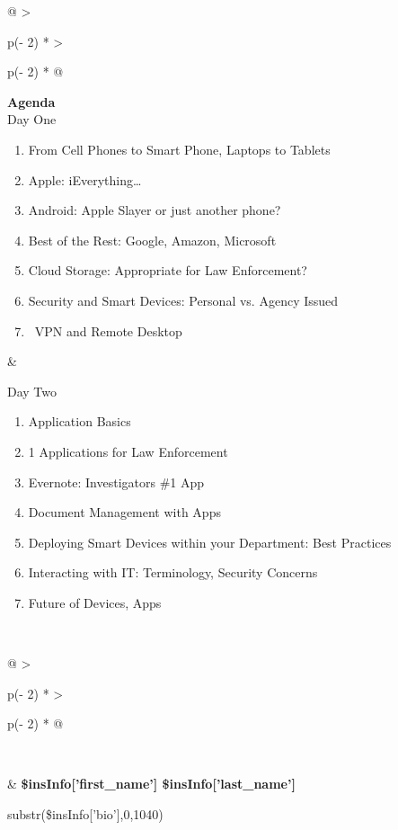 \documentclass[legalpaper,10pt]{article}
\providecommand{\tightlist}{
  \setlength{\itemsep}{0pt}\setlength{\parskip}{0pt}}
\begin{document}
\begin{longtable}[]{@{}
  >{\raggedright\arraybackslash}p{(\columnwidth - 2\tabcolsep) * }
  >{\raggedright\arraybackslash}p{(\columnwidth - 2\tabcolsep) * }@{}}
\toprule
\endhead
\begin{minipage}[t]{\linewidth}\raggedright
\textbf{Agenda}\\
Day One

\begin{enumerate}
\tightlist
\item
  From Cell Phones to Smart Phone, Laptops to Tablets
\item
  Apple: iEverything\ldots{}
\item
  Android: Apple Slayer or just another phone?
\item
  Best of the Rest: Google, Amazon, Microsoft
\item
  Cloud Storage: Appropriate for Law Enforcement?
\item
  Security and Smart Devices: Personal vs. Agency Issued
\item
  ~VPN and Remote Desktop
\end{enumerate}
\end{minipage} & \begin{minipage}[t]{\linewidth}\raggedright
\hfill\break
Day Two

\begin{enumerate}
\tightlist
\item
  Application Basics
\item
  1 Applications for Law Enforcement
\item
  Evernote: Investigators \#1 App
\item
  Document Management with Apps
\item
  Deploying Smart Devices within your Department: Best Practices
\item
  Interacting with IT: Terminology, Security Concerns
\item
  Future of Devices, Apps~
\end{enumerate}
\end{minipage} \\
\bottomrule
\end{longtable}

\begin{longtable}[]{@{}
  >{\raggedright\arraybackslash}p{(\columnwidth - 2\tabcolsep) * }
  >{\raggedright\arraybackslash}p{(\columnwidth - 2\tabcolsep) * }@{}}
\toprule
\endhead
\begin{minipage}[t]{\linewidth}\raggedright
\ 
\end{minipage} & \textbf{\$insInfo{[}'first\_name'{]}
\$insInfo{[}'last\_name'{]}}

substr(\$insInfo{[}'bio'{]},0,1040) \\
\bottomrule
\end{longtable}
\end{document}
